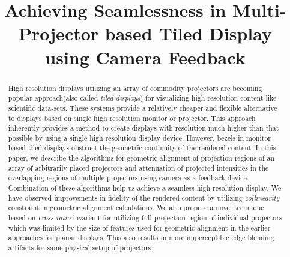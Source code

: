 \documentclass[letterpaper,10pt,conference]{/home/pranav/Desktop/Publication_work/latex_class_files/IEEEtran}
\begin{document}
\title{Achieving Seamlessness in Multi-Projector based Tiled Display using Camera Feedback}





\author{
}



    



\maketitle

\begin{abstract}
High resolution displays utilizing an array of commodity projectors are becoming popular approach(also called \textit{tiled displays}) for visualizing high resolution content like scientific data-sets. These systems provide a relatively cheaper and flexible alternative to displays based on single high resolution monitor or projector. This approach inherently provides a method to create displays with resolution much higher than that possible by using a single high resolution display device. However, bezels in monitor based tiled displays obstruct the geometric continuity of the rendered content. In this paper, we describe the algorithms for geometric alignment of projection regions of an array of arbitrarily placed projectors and attenuation of projected intensities in the overlapping regions of multiple projectors using camera as a feedback device. Combination of these algorithms help us achieve a seamless high resolution display. We have observed improvements in fidelity of the rendered content by utilizing \textit{collinearity} constraint in geometric alignment calculations. We also propose a novel technique based on \textit{cross-ratio} invariant for utilizing full projection region of individual projectors which was limited by the size of features used for geometric alignment in the earlier approaches for planar displays. This also results in more imperceptible edge blending artifacts for same physical setup of projectors.
\end{abstract}
\end{document}
